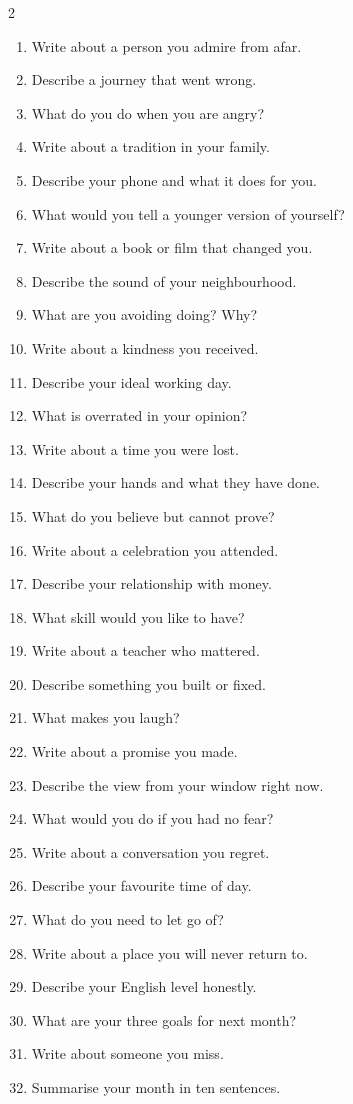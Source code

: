 \begin{tableau}
\begin{multicols}{2}
\begin{anglais}
\begin{enumerate}
\item Write about a person you admire from afar.
\item Describe a journey that went wrong.
\item What do you do when you are angry?
\item Write about a tradition in your family.
\item Describe your phone and what it does for you.
\item What would you tell a younger version of yourself?
\item Write about a book or film that changed you.
\item Describe the sound of your neighbourhood.
\item What are you avoiding doing? Why?
\item Write about a kindness you received.
\item Describe your ideal working day.
\item What is overrated in your opinion?
\item Write about a time you were lost.
\item Describe your hands and what they have done.
\item What do you believe but cannot prove?
\item Write about a celebration you attended.
\item Describe your relationship with money.
\item What skill would you like to have?
\item Write about a teacher who mattered.
\item Describe something you built or fixed.
\item What makes you laugh?
\item Write about a promise you made.
\item Describe the view from your window right now.
\item What would you do if you had no fear?
\item Write about a conversation you regret.
\item Describe your favourite time of day.
\item What do you need to let go of?
\item Write about a place you will never return to.
\item Describe your English level honestly.
\item What are your three goals for next month?
\item Write about someone you miss.
\item Summarise your month in ten sentences.
\end{enumerate}
\end{anglais}
\end{multicols}
\end{tableau}

